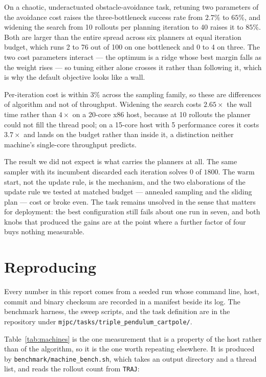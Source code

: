 \documentclass[conference]{IEEEtran}
\newcounter{algo}
\begin{document}
On a chaotic, underactuated obstacle-avoidance task, retuning two parameters of
the avoidance cost raises the three-bottleneck success rate from $2.7\%$ to
$65\%$, and widening the search from 10 rollouts per planning iteration to 40
raises it to $85\%$. Both are larger than the entire spread across six planners
at equal iteration budget, which runs 2 to 76 out of 100 on one bottleneck and 0
to 4 on three. The two cost parameters interact --- the optimum is a ridge whose
best margin falls as the weight rises --- so tuning either alone crosses it
rather than following it, which is why the default objective looks like a wall.

Per-iteration cost is within $3\%$ across the sampling family, so these are
differences of algorithm and not of throughput. Widening the search costs
$2.65\times$ the wall time rather than $4\times$ on a 20-core x86 host, because
at 10 rollouts the planner could not fill the thread pool; on a 15-core host
with 5 performance cores it costs $3.7\times$ and lands on the budget rather
than inside it, a distinction neither machine's single-core throughput predicts.

The result we did not expect is what carries the planners at all. The same
sampler with its incumbent discarded each iteration solves $0$ of $1800$. The
warm start, not the update rule, is the mechanism, and the two elaborations of
the update rule we tested at matched budget --- annealed sampling and the
sliding plan --- cost or broke even. The task remains unsolved in the sense that
matters for deployment: the best configuration still fails about one run in
seven, and both knobs that produced the gains are at the point where a further
factor of four buys nothing measurable.

\section*{Reproducing}

Every number in this report comes from a seeded run whose command line, host,
commit and binary checksum are recorded in a manifest beside its log. The
benchmark harness, the sweep scripts, and the task definition are in the
repository under \texttt{mjpc/tasks/triple\_pendulum\_cartpole/}.

Table~\ref{tab:machines} is the one measurement that is a property of the host
rather than of the algorithm, so it is the one worth repeating elsewhere. It is
produced by \texttt{benchmark/machine\_bench.sh}, which takes an output
directory and a thread list, and reads the rollout count from \texttt{TRAJ}:
\end{document}
